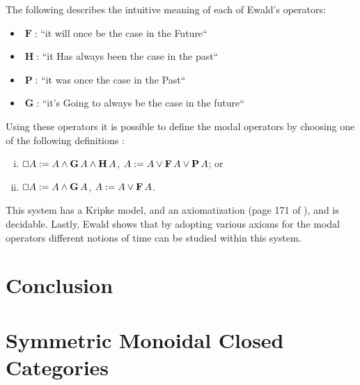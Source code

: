 \documentclass{article}
\let\Diamond\relax
\renewcommand{\Box}{\oblong}
\newcommand{\F}{\mathop{\textbf{F}}}
\renewcommand{\P}{\mathop{\textbf{P}}}
\newcommand{\G}{\mathop{\textbf{G}}}
\renewcommand{\H}{\mathop{\textbf{H}}}
\begin{document}
The following describes the intuitive meaning of each of Ewald's
operators:
\begin{itemize}
\item[] $\F$: ``it will once be the case in the Future``  
\item[] $\H$: ``it Has always been the case in the past``
\item[] $\P$: ``it was once the case in the Past``
\item[] $\G$: ``it's Going to  always be the case in the future``  
\end{itemize}


Using these operators it is possible to define the  modal
operators by choosing one of the following definitions
\cite{ewald1986}:
\begin{enumerate}[i.]
\item $\Box A := A \land \G A \land \H A$, $\Diamond A := A \lor \F A \lor \P A$; or
\item $\Box A := A \land \G A$, $\Diamond A := A \lor \F A$.
\end{enumerate}

This system has a Kripke model, and an axiomatization (page 171 of
\cite{ewald1986}), and is decidable.  Lastly, Ewald shows that by
adopting various axioms for the modal operators different notions of
time can be studied within this system.

\section{Conclusion}




\appendix

\section{Symmetric Monoidal Closed Categories}
\label{sec:symmetric_monoidal_closed_categories}
\end{document}
